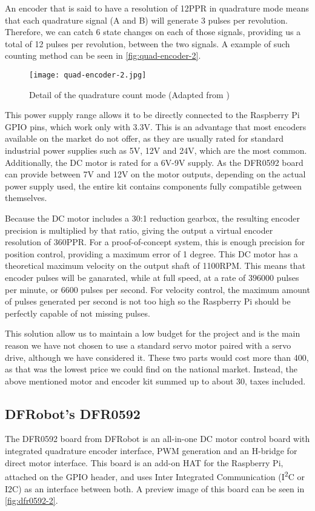 An encoder that is said to have a resolution of 12PPR in quadrature mode means that each quadrature signal (A and B) will generate 3 pulses per revolution.
Therefore, we can catch 6 state changes on each of those signals, providing us a total of 12 pulses per revolution, between the two signals.
A example of such counting method can be seen in \autoref{fig:quad-encoder-2}.

\begin{figure}[htp]
	\centering
	\texttt{[image: quad-encoder-2.jpg]}
	\caption{Detail of the quadrature count mode (Adapted from \cite{technology:quad-encoder})}
	\label{fig:quad-encoder-2}
\end{figure}

This power supply range allows it to be directly connected to the Raspberry Pi GPIO pins, which work only with 3.3V.
This is an advantage that most encoders available on the market do not offer, as they are usually rated for standard industrial power supplies  such as 5V, 12V and 24V, which are the most common.
Additionally, the DC motor is rated for a 6V-9V supply.
As the DFR0592 board can provide between 7V and 12V on the motor outputs, depending on the actual power supply used, the entire kit contains components fully compatible getween themselves.

Because the DC motor includes a 30:1 reduction gearbox, the resulting encoder precision is multiplied by that ratio, giving the output a virtual encoder resolution of 360PPR.
For a proof-of-concept system, this is enough precision for position control, providing a maximum error of 1 degree.
This DC motor has a theoretical maximum velocity on the output shaft of 1100RPM.
This means that encoder pulses will be ganarated, while at full speed, at a rate of $396000$ pulses per minute, or $6600$ pulses per second.
For velocity control, the maximum amount of pulses generated per second is not too high so the Raspberry Pi should be perfectly capable of not missing pulses.

This solution allow us to maintain a low budget for the project and is the main reason we have not chosen to use a standard servo motor paired with a servo drive, although we have considered it.
These two parts would cost more than 400\texteuro, as that was the lowest price we could find on the national market.
Instead, the above mentioned motor and encoder kit summed up to about 30\texteuro, taxes included.

\subsection{DFRobot's DFR0592}
The DFR0592 board from DFRobot is an all-in-one DC motor control board with integrated quadrature encoder interface, PWM generation and an H-bridge for direct motor interface.
This board is an add-on HAT for the Raspberry Pi, attached on the GPIO header, and uses Inter Integrated Communication (I\textsuperscript{2}C or I2C) as an interface between both.
A preview image of this board can be seen in \autoref{fig:dfr0592-2}.

